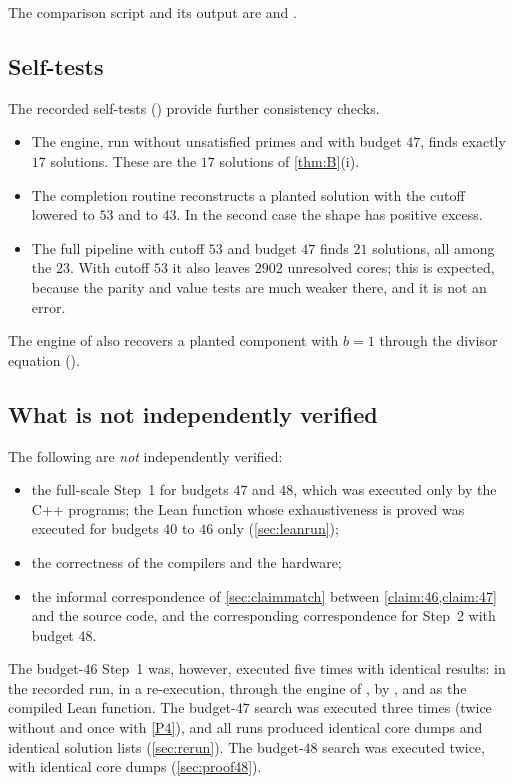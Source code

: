 \documentclass[11pt]{article}
\begin{document}
The comparison script and its output are  and .

\subsection{Self-tests}

The recorded self-tests () provide further consistency checks.
\begin{itemize}
\item The engine, run without unsatisfied primes and with budget $47$, finds exactly $17$ solutions. These are the $17$ solutions of \cref{thm:B}(i).
\item The completion routine reconstructs a planted solution with the cutoff lowered to $53$ and to $43$. In the second case the shape has positive excess.
\item The full pipeline with cutoff $53$ and budget $47$ finds $21$ solutions, all among the $23$. With cutoff $53$ it also leaves $2902$ unresolved cores; this is expected, because the parity and value tests are much weaker there, and it is not an error.
\end{itemize}
The engine of  also recovers a planted component with $b=1$ through the divisor equation ().

\subsection{What is not independently verified}

The following are \emph{not} independently verified:
\begin{itemize}
\item the full-scale Step~1 for budgets $47$ and $48$, which was executed only by the C++ programs; the Lean function whose exhaustiveness is proved was executed for budgets $40$ to $46$ only (\cref{sec:leanrun});
\item the correctness of the compilers and the hardware;
\item the informal correspondence of \cref{sec:claimmatch} between \cref{claim:46,claim:47} and the source code, and the corresponding correspondence for Step~2 with budget $48$.
\end{itemize}
The budget-$46$ Step~1 was, however, executed five times with identical results: in the recorded run, in a re-execution, through the engine of , by , and as the compiled Lean function. The budget-$47$ search was executed three times (twice without and once with \ref{P4}), and all runs produced identical core dumps and identical solution lists (\cref{sec:rerun}). The budget-$48$ search was executed twice, with identical core dumps (\cref{sec:proof48}).
\end{document}
